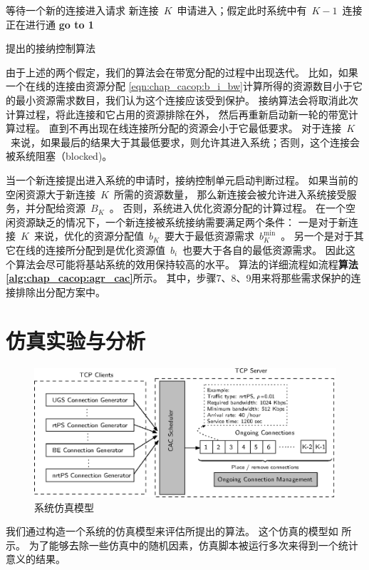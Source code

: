 \begin{algorithm}[H]
\SetAlgoLined
等待一个新的连接进入请求\;
新连接~$K$~申请进入；假定此时系统中有~$K-1$~连接正在进行通\;
{\bf{go to 1}}\;
\caption{提出的接纳控制算法} \label{alg:chap_cacop:agr_cac}
\end{algorithm}


由于上述的两个假定，我们的算法会在带宽分配的过程中出现迭代。
比如，如果一个在线的连接由资源分配 \eqref{eqn:chap_cacop:b_i_bw}计算所得的资源数目小于它的最小资源需求数目，我们认为这个连接应该受到保护。
接纳算法会将取消此次计算过程，将此连接和它占用的资源排除在外，
然后再重新启动新一轮的带宽计算过程。
直到不再出现在线连接所分配的资源会小于它最低要求。
对于连接~$K$~来说，如果最后的结果大于其最低要求，则允许其进入系统；否则，这个连接会被系统阻塞（blocked)。


当一个新连接提出进入系统的申请时，接纳控制单元启动判断过程。
如果当前的空闲资源大于新连接~$K$~所需的资源数量，
那么新连接会被允许进入系统接受服务，并分配给资源~$B_K$~。
否则，系统进入优化资源分配的计算过程。
在一个空闲资源缺乏的情况下，一个新连接被系统接纳需要满足两个条件：
一是对于新连接~$K$~来说，优化的资源分配值~$b_K$~要大于最低资源需求~$b_K^{\min}$~。
另一个是对于其它在线的连接所分配到是优化资源值~$b_i$~也要大于各自的最低资源需求。
因此这个算法会尽可能将基站系统的效用保持较高的水平。
算法的详细流程如流程{\bf{算法 \ref{alg:chap_cacop:agr_cac}}}所示。
其中，步骤7、8、9用来将那些需求保护的连接排除出分配方案中。


\section{仿真实验与分析}
\begin{figure}[tb]
\centering
\includegraphics {cacop_simulator.eps}
\caption{系统仿真模型} 
\label{fig:chap_cacop:sim_cfg}
\end{figure}
我们通过构造一个系统的仿真模型来评估所提出的算法。
这个仿真的模型如 所示。
为了能够去除一些仿真中的随机因素，仿真脚本被运行多次来得到一个统计意义的结果。

